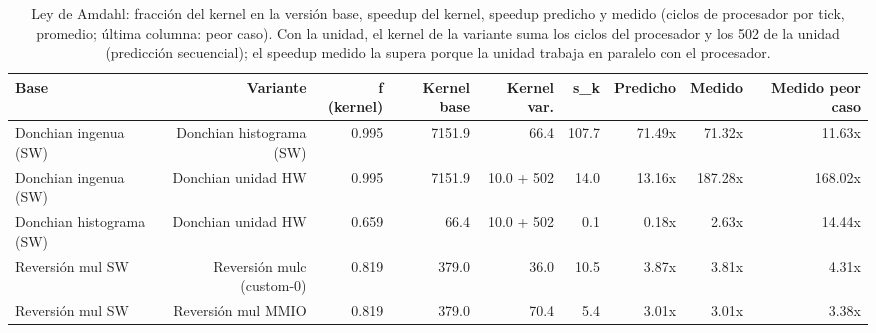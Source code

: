 \begin{table}[htbp]
\centering
\small
\begin{adjustbox}{max width=\linewidth}
\begin{tabular}{lrrrrrrrr}
\toprule
Base & Variante & f (kernel) & Kernel base & Kernel var. & s\_k & Predicho & Medido & Medido peor caso \\
\midrule
Donchian ingenua (SW) & Donchian histograma (SW) & 0.995 & 7151.9 & 66.4 & 107.7 & 71.49x & 71.32x & 11.63x \\
Donchian ingenua (SW) & Donchian unidad HW & 0.995 & 7151.9 & 10.0 + 502 & 14.0 & 13.16x & 187.28x & 168.02x \\
Donchian histograma (SW) & Donchian unidad HW & 0.659 & 66.4 & 10.0 + 502 & 0.1 & 0.18x & 2.63x & 14.44x \\
Reversión mul SW & Reversión mulc (custom-0) & 0.819 & 379.0 & 36.0 & 10.5 & 3.87x & 3.81x & 4.31x \\
Reversión mul SW & Reversión mul MMIO & 0.819 & 379.0 & 70.4 & 5.4 & 3.01x & 3.01x & 3.38x \\
\bottomrule
\end{tabular}
\end{adjustbox}
\caption{Ley de Amdahl: fracción del kernel en la versión base, speedup del kernel, speedup predicho y medido (ciclos de procesador por tick, promedio; última columna: peor caso). Con la unidad, el kernel de la variante suma los ciclos del procesador y los 502 de la unidad (predicción secuencial); el speedup medido la supera porque la unidad trabaja en paralelo con el procesador.}
\end{table}
